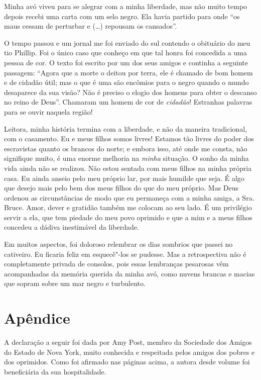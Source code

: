 Minha avó viveu para se alegrar com a
minha liberdade, mas não muito tempo depois recebi uma carta com um selo
negro. Ela havia partido para onde ``os maus cessam de perturbar e
(\ldots{}) repousam os cansados''.

O tempo passou e um jornal me foi
enviado do sul contendo o obituário do meu tio Phillip. Foi o único caso
que conheço em que tal honra foi concedida a uma pessoa de cor. O texto
foi escrito por um dos seus amigos e continha a seguinte passagem:
``Agora que a morte o deitou por terra, ele é chamado de bom homem e de
cidadão útil; mas o que é uma são encômios para o negro quando o mundo
desaparece da sua visão? Não é preciso o elogio dos homens para obter o
descanso no reino de Deus''. Chamaram um homem de cor de \emph{cidadão}!
Estranhas palavras para se ouvir naquela região!

Leitora, minha história termina com a
liberdade, e não da maneira tradicional, com o casamento. Eu e meus
filhos somos livres! Estamos tão livres do poder dos escravistas quanto
os brancos do norte; e embora isso, até onde me consta, não signifique
muito, é uma enorme melhoria na \emph{minha} situação. O sonho da minha
vida ainda não se realizou. Não estou sentada com meus filhos na minha
própria casa. Eu ainda anseio pelo meu próprio lar, por mais humilde que
seja. É algo que desejo mais pelo bem dos meus filhos do que do meu
próprio. Mas Deus ordenou as circunstâncias de modo que eu permaneça com
a minha amiga, a Sra. Bruce. Amor, dever e gratidão também me colocam ao
seu lado. É um privilégio servir a ela, que tem piedade do meu povo
oprimido e que a mim e a meus filhos concedeu a dádiva inestimável da
liberdade.

Em muitos aspectos, foi doloroso
relembrar os dias sombrios que passei no cativeiro. Eu ficaria feliz em
esquecê"-los se pudesse. Mas a retrospectiva não é completamente privada
de consolos, pois essas lembranças pesarosas vêm acompanhadas da memória
querida da minha avó, como nuvens brancas e macias que sopram sobre um
mar negro e turbulento.

\chapter{Apêndice}

A declaração a seguir foi dada por Amy
Post, membro da Sociedade dos Amigos do Estado de Nova York, muito
conhecida e respeitada pelos amigos dos pobres e dos oprimidos. Como foi
afirmado nas páginas acima, a autora desde volume foi beneficiária da
sua hospitalidade.

